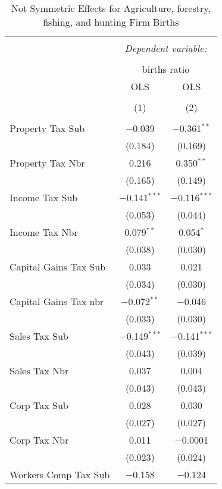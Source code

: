 
\begin{table}[!htbp] \centering 
  \caption{Not Symmetric Effects for  Agriculture, forestry, fishing, and hunting Firm Births} 
  \label{11noequality} 
\begin{tabular}{@{\extracolsep{5pt}}lcc} 
\\[-1.8ex]\hline 
\hline \\[-1.8ex] 
 & \multicolumn{2}{c}{\textit{Dependent variable:}} \\ 
\cline{2-3} 
\\[-1.8ex] & \multicolumn{2}{c}{births ratio} \\ 
 & OLS & OLS \\ 
\\[-1.8ex] & (1) & (2)\\ 
\hline \\[-1.8ex] 
 Property Tax Sub & $-$0.039 & $-$0.361$^{**}$ \\ 
  & (0.184) & (0.169) \\ 
  Property Tax Nbr & 0.216 & 0.350$^{**}$ \\ 
  & (0.165) & (0.149) \\ 
  Income Tax Sub & $-$0.141$^{***}$ & $-$0.116$^{***}$ \\ 
  & (0.053) & (0.044) \\ 
  Income Tax Nbr & 0.079$^{**}$ & 0.054$^{*}$ \\ 
  & (0.038) & (0.030) \\ 
  Capital Gains Tax Sub & 0.033 & 0.021 \\ 
  & (0.034) & (0.030) \\ 
  Capital Gains Tax nbr & $-$0.072$^{**}$ & $-$0.046 \\ 
  & (0.033) & (0.030) \\ 
  Sales Tax Sub & $-$0.149$^{***}$ & $-$0.141$^{***}$ \\ 
  & (0.043) & (0.039) \\ 
  Sales Tax Nbr & 0.037 & 0.004 \\ 
  & (0.043) & (0.043) \\ 
  Corp Tax Sub & 0.028 & 0.030 \\ 
  & (0.027) & (0.027) \\ 
  Corp Tax Nbr & 0.011 & $-$0.0001 \\ 
  & (0.023) & (0.024) \\ 
  Workers Comp Tax Sub & $-$0.158 & $-$0.124 \\ 

\end{tabular}
\end{table}
